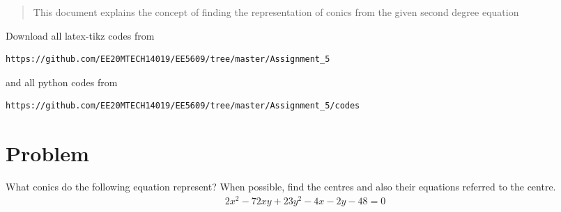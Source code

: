 \documentclass[journal,12pt,twocolumn]{IEEEtran}
\begin{document}
%
\begin{abstract}
This document explains the concept of finding the representation of conics from the given second degree equation
\end{abstract}
Download all latex-tikz codes from 
%
\begin{lstlisting}
https://github.com/EE20MTECH14019/EE5609/tree/master/Assignment_5
\end{lstlisting}
and all python codes from 
\begin{lstlisting}
https://github.com/EE20MTECH14019/EE5609/tree/master/Assignment_5/codes
\end{lstlisting}
%
\section{Problem}

What conics do the following equation represent? When possible, find the centres and also their equations referred to the centre.
\begin{align}
2x^2-72xy+23y^2-4x-2y-48=0\label{ques}
\end{align}
\end{document}
